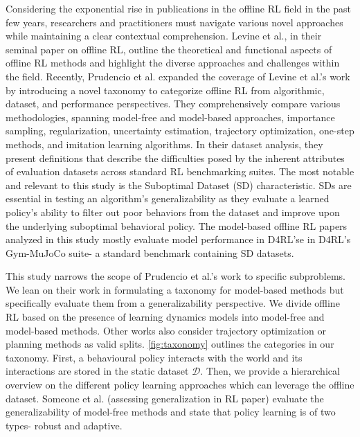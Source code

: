 Considering the exponential rise in publications in the offline RL field in the past few years, researchers and practitioners must navigate various novel approaches while maintaining a clear contextual comprehension. Levine et al., in their seminal paper on offline RL, outline the theoretical and functional aspects of offline RL methods and highlight the diverse approaches and challenges within the field. Recently, Prudencio et al. expanded the coverage of Levine et al.’s work by introducing a novel taxonomy to categorize offline RL from algorithmic, dataset, and performance perspectives. They comprehensively compare various methodologies, spanning model-free and model-based approaches, importance sampling, regularization, uncertainty estimation, trajectory optimization, one-step methods, and imitation learning algorithms. In their dataset analysis, they present definitions that describe the difficulties posed by the inherent attributes of evaluation datasets across standard RL benchmarking suites. The most notable and relevant to this study is the Suboptimal Dataset (SD) characteristic. SDs are essential in testing an algorithm’s generalizability as they evaluate a learned policy’s ability to filter out poor behaviors from the dataset and improve upon the underlying suboptimal behavioral policy. The model-based offline RL papers analyzed in this study mostly evaluate model performance in D4RL’se in D4RL’s Gym-MuJoCo suite- a standard benchmark containing SD datasets. 

This study narrows the scope of Prudencio et al.’s work to specific subproblems. We lean on their work in formulating a taxonomy for model-based methods but specifically evaluate them from a generalizability perspective. We divide offline RL based on the presence of learning dynamics models into model-free and model-based methods. Other works also consider trajectory optimization or planning methods as valid splits. \autoref{fig:taxonomy} outlines the categories in our taxonomy. First, a behavioural policy interacts with the world and its interactions are stored in the static dataset $\mathcal{D}$. Then, we provide a hierarchical overview on the different policy learning approaches which can leverage the offline dataset. Someone et al. (assessing generalization in RL paper) evaluate the generalizability of model-free methods and state that policy learning is of two types- robust and adaptive. 

